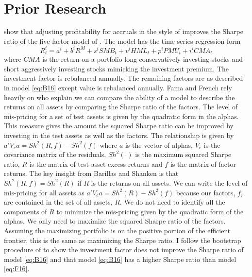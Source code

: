 
\section{Prior Research}

\textcite{fama2016choosing} show that adjusting profitability for accruals in
the style of \textcite{ball2016accruals} improves the Sharpe ratio of the
five-factor model of \textcite{fama2015five}.
The model has the time series regression form
\begin{equation} \label{eq:F16}
R_t^i = a^i+b^iR^M+s^iSMB_t+v^iHML_t+p^iPMU_t+i^iCMA_t
\end{equation}
where $CMA$ is the return on a portfolio long conservatively investing stocks
and short aggressively investing stocks mimicking the investment premium.
The investment factor is rebalanced annually.
The remaining factors are as described in model \ref{eq:B16} except value is
rebalanced annually.
Fama and French rely heavily on \textcite{barillas2016alpha} who explain we can
compare the ability of a model to describe the returns on all assets by
comparing the Sharpe ratio of the factors.
The level of mis-pricing for a set of test assets is given by the quadratic
form in the alphas.
This measure gives the amount the squared Sharpe ratio can be improved by
investing in the test assets as well as the factors.
The relationship is given by
$a'V_ea=Sh^2\left(R,f\right)-Sh^2\left(f\right)$
where $a$ is the vector of alphas,
$V_e$ is the covariance matrix of the residuals,
$Sh^2\left(\cdot\right)$ is the maximum squared Sharpe ratio,
$R$ is the matrix of test asset excess returns and $f$ is the matrix of factor
returns.
The key insight from Barillas and Shanken is that
$Sh^2\left(R,f\right)=Sh^2\left(R\right)$ if $R$ is the returns on all assets.
We can write the level of mis-pricing for all assets as
$a'V_ea=Sh^2\left(R\right)-Sh^2\left(f\right)$ because our factors, $f$, are
contained in the set of all assets, $R$.
We do not need to identify all the components of $R$ to minimize the
mis-pricing given by the quadratic form of the alphas.
We only need to maximize the squared Sharpe ratio of the factors.
Assuming the maximizing portfolio is on the positive portion of the efficient
frontier, this is the same as maximizing the Sharpe ratio.
I follow the bootstrap procedure of \textcite{fama2016choosing} to show the
investment factor does not improve the Sharpe ratio of model \ref{eq:B16} and
that model \ref{eq:B16} has a higher Sharpe ratio than model \ref{eq:F16}.

